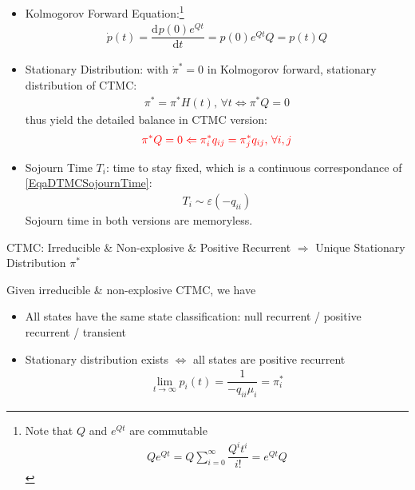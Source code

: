 \begin{itemize}[topsep=2pt,itemsep=0pt]
    Comment: with Gershgorin Circle Theorem \footnote{Detail see \url{https://v1ncent19.github.io/texts/DiagonalDominant/}.}, $ Q $ as a diagonal dominant matrix, is negative definite, which guarentee the convergence of $ H(t)=e^{Qt}<\infty $
    \item Kolmogorov Forward Equation:\footnote{Note that $ Q $ and $ e^{Qt} $ are commutable
    \begin{align*}
         Qe^{Qt}=Q\sum_{i=0}^\infty\dfrac{Q^it^i}{i!}=e^{Qt}Q
    \end{align*}
    }
    \begin{align*}
        \dot{p}(t)=\dfrac{\mathrm{d}^{} p(0)e^{Qt}}{\mathrm{d}t}=p(0)e^{Qt}Q=p(t)Q
    \end{align*}
    \item Stationary Distribution: with $ \dot{\pi}^*=0 $ in Kolmogorov forward, stationary distribution of CTMC:
    \begin{align*}
         \pi^*=\pi^*H(t),\,\forall t\Leftrightarrow \pi^*Q=0
    \end{align*}
    thus yield the detailed balance in CTMC version:
    \begin{align*}
         \color{red}\pi^*Q=0\Leftarrow \pi^*_iq_{ij}=\pi^*_jq_{ij},\,\forall i,j
    \end{align*}
    \item Sojourn Time $ T_i $: time to stay fixed, which is a continuous correspondance of \ref{EqaDTMCSojournTime}:
    \begin{align*}
        T_i\sim \varepsilon (-q_{ii}) 
    \end{align*}
    Sojourn time in both versions are memoryless.
\end{itemize}

\begin{point}
    CTMC: Irreducible \& Non-explosive \& Positive Recurrent $ \Rightarrow  $ Unique Stationary Distribution $ \pi^* $
\end{point}

Given irreducible \& non-explosive CTMC, we have
\begin{itemize}[topsep=2pt,itemsep=0pt]
    \item All states have the same state classification: null recurrent / positive recurrent / transient
    \item Stationary distribution exists $ \Leftrightarrow $ all states are positive recurrent
    \begin{align*}
        \lim_{t\to\infty}p_i(t)=\dfrac{1}{-q_{ii}\mu _i} = \pi^*_i
    \end{align*}
\end{itemize}

